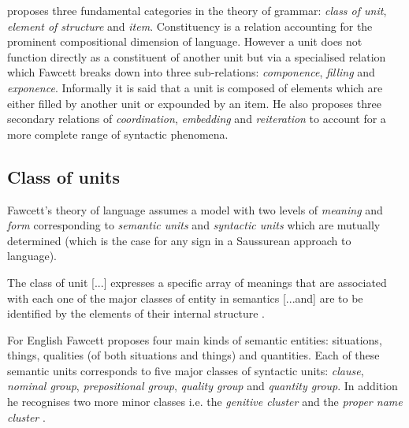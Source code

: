 \citet{Fawcett2000} proposes three fundamental categories in the theory of grammar: \textit{class of unit}, \textit{element of structure} and \textit{item}. Constituency is a relation accounting for the prominent compositional dimension of language. However a unit does not function directly as a constituent of another unit but via a specialised relation which Fawcett breaks down into three sub-relations: \textit{componence}, \textit{filling} and \textit{exponence}. Informally it is said that a unit is composed of elements which are either filled by another unit or expounded by an item. He also proposes three secondary relations of \textit{coordination}, \textit{embedding} and \textit{reiteration} to account for a more complete range of syntactic phenomena.

\subsection{Class of units}
Fawcett's theory of language assumes a model with two levels of \textit{meaning} and \textit{form} corresponding to \textit{semantic units} and \textit{syntactic units} which are mutually determined (which is the case for any sign in a Saussurean approach to language). 

\begin{definition}\label{def:class2}
	The class of unit [...] expresses a specific array of meanings that are associated with each one of the major classes of entity in semantics [...and] are to be identified by the elements of their internal structure \citep[195]{Fawcett2000}. 
\end{definition}

For English Fawcett proposes four main kinds of semantic entities: situations, things, qualities (of both situations and things) and quantities. Each of these semantic units corresponds to five major classes of syntactic units: \textit{clause}, \textit{nominal group}, \textit{prepositional group}, \textit{quality group} and \textit{quantity group}. In addition he recognises two more minor classes i.e. the \textit{genitive cluster} and the \textit{proper name cluster} \citep[193--194]{Fawcett2000}. 



